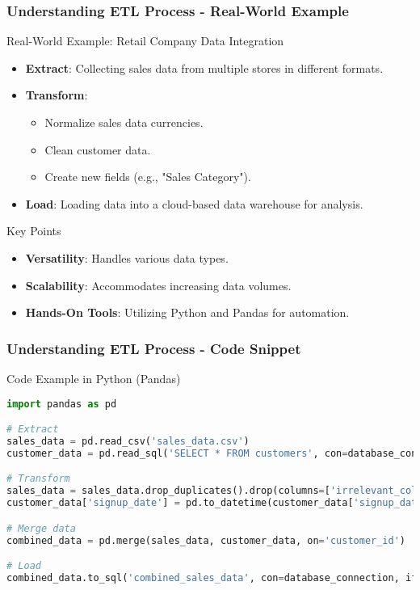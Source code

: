 \documentclass[aspectratio=169]{beamer}
\begin{document}
\begin{frame}[fragile]
    \frametitle{Understanding ETL Process - Real-World Example}
    \begin{block}{Real-World Example: Retail Company Data Integration}
        \begin{itemize}
            \item \textbf{Extract}: Collecting sales data from multiple stores in different formats.
            \item \textbf{Transform}: 
                \begin{itemize}
                    \item Normalize sales data currencies.
                    \item Clean customer data.
                    \item Create new fields (e.g., "Sales Category").
                \end{itemize}
            \item \textbf{Load}: Loading data into a cloud-based data warehouse for analysis.
        \end{itemize}
    \end{block}

    \begin{block}{Key Points}
        \begin{itemize}
            \item \textbf{Versatility}: Handles various data types.
            \item \textbf{Scalability}: Accommodates increasing data volumes.
            \item \textbf{Hands-On Tools}: Utilizing Python and Pandas for automation.
        \end{itemize}
    \end{block}
\end{frame}

\begin{frame}[fragile]
    \frametitle{Understanding ETL Process - Code Snippet}
    \begin{block}{Code Example in Python (Pandas)}
        \begin{lstlisting}[language=Python]
import pandas as pd

# Extract
sales_data = pd.read_csv('sales_data.csv')
customer_data = pd.read_sql('SELECT * FROM customers', con=database_connection)

# Transform
sales_data = sales_data.drop_duplicates().drop(columns=['irrelevant_column'])
customer_data['signup_date'] = pd.to_datetime(customer_data['signup_date'])

# Merge data
combined_data = pd.merge(sales_data, customer_data, on='customer_id')

# Load
combined_data.to_sql('combined_sales_data', con=database_connection, if_exists='replace', index=False)
        \end{lstlisting}
    \end{block}
\end{frame}
\end{document}
